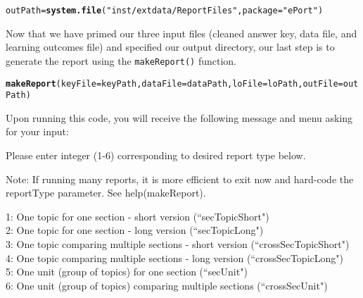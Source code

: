 \documentclass{article}\usepackage[]{graphicx}\usepackage[]{color}
\makeatletter
\newcommand{\hlstr}[1]{\textcolor[rgb]{0.192,0.494,0.8}{#1}}%
\newcommand{\hlstd}[1]{\textcolor[rgb]{0.345,0.345,0.345}{#1}}%
\newcommand{\hlkwb}[1]{\textcolor[rgb]{0.69,0.353,0.396}{#1}}%
\newcommand{\hlkwc}[1]{\textcolor[rgb]{0.333,0.667,0.333}{#1}}%
\newcommand{\hlkwd}[1]{\textcolor[rgb]{0.737,0.353,0.396}{\textbf{#1}}}%
\newenvironment{kframe}{%
 \def\at@end@of@kframe{}%
 \ifinner\ifhmode%
  \def\at@end@of@kframe{\end{minipage}}%
  \begin{minipage}{\columnwidth}%
 \fi\fi%
 \def\FrameCommand##1{\hskip\@totalleftmargin \hskip-\fboxsep
 \colorbox{shadecolor}{##1}\hskip-\fboxsep
     \hskip-\linewidth \hskip-\@totalleftmargin \hskip\columnwidth}%
 \MakeFramed {\advance\hsize-\width
   \@totalleftmargin\z@ \linewidth\hsize
   \@setminipage}}%
 {\par\unskip\endMakeFramed%
 \at@end@of@kframe}
\newenvironment{knitrout}{}{} %
\numberwithin{equation}{section} %
\makeatother
\begin{document}
\begin{knitrout}
\color{fgcolor}\begin{kframe}
\begin{alltt}
\hlstd{outPath} \hlkwb{=} \hlkwd{system.file}\hlstd{(}\hlstr{"inst/extdata/ReportFiles"}\hlstd{,} \hlkwc{package}\hlstd{=}\hlstr{"ePort"}\hlstd{)}
\end{alltt}
\end{kframe}
\end{knitrout}

Now that we have primed our three input files (cleaned answer key, data file, and learning outcomes file) and specified our output directory, our last step is to generate the report using the \texttt{makeReport()} function.

\begin{knitrout}
\color{fgcolor}\begin{kframe}
\begin{alltt}
\hlkwd{makeReport}\hlstd{(}\hlkwc{keyFile}\hlstd{=keyPath,} \hlkwc{dataFile}\hlstd{=dataPath,} \hlkwc{loFile}\hlstd{=loPath,} \hlkwc{outFile}\hlstd{=outPath)}
\end{alltt}
\end{kframe}
\end{knitrout}

Upon running this code, you will receive the following message and menu asking for your input:

\begin{framed}
\vspace{1mm}
Please enter integer (1-6) corresponding to desired report type below.

Note: If running many reports, it is more efficient to exit now and hard-code the reportType parameter. See help(makeReport).

1: One topic for one section - short version (``secTopicShort")\\
2: One topic for one section - long version (``secTopicLong")\\
3: One topic comparing multiple sections - short version (``crossSecTopicShort")\\
4: One topic comparing multiple sections - long version (``crossSecTopicLong")\\
5: One unit (group of topics) for one section (``secUnit")\\
6: One unit (group of topics) comparing multiple sections (``crossSecUnit")\\
\end{framed}
\end{document}
